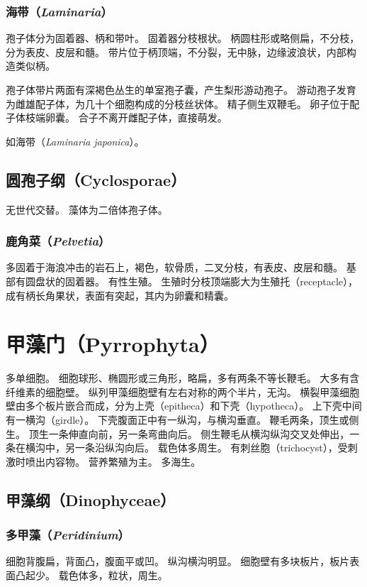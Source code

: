 \documentclass[11pt]{article}
\begin{document}
\subsubsection{海带（\textit{Laminaria}）}
孢子体分为固着器、柄和带叶。
固着器分枝根状。
柄圆柱形或略侧扁，不分枝，分为表皮、皮层和髓。
带片位于柄顶端，不分裂，无中脉，边缘波浪状，内部构造类似柄。

\newline

孢子体带片两面有深褐色丛生的单室孢子囊，产生梨形游动孢子。
游动孢子发育为雌雄配子体，为几十个细胞构成的分枝丝状体。
精子侧生双鞭毛。
卵子位于配子体枝端卵囊。
合子不离开雌配子体，直接萌发。

\newline

如海带（\textit{Laminaria japonica}）。

\subsection{圆孢子纲（Cyclosporae）}
无世代交替。
藻体为二倍体孢子体。

\subsubsection{鹿角菜（\textit{Pelvetia}）}
多固着于海浪冲击的岩石上，褐色，软骨质，二叉分枝，有表皮、皮层和髓。
基部有圆盘状的固着器。
有性生殖。
生殖时分枝顶端膨大为生殖托（receptacle），成有柄长角果状，表面有突起，其内为卵囊和精囊。

\section{甲藻门（Pyrrophyta）}
多单细胞。
细胞球形、椭圆形或三角形，略扁，多有两条不等长鞭毛。
大多有含纤维素的细胞壁。
纵列甲藻细胞壁有左右对称的两个半片，无沟。
横裂甲藻细胞壁由多个板片嵌合而成，分为上壳（epitheca）和下壳（hypotheca）。
上下壳中间有一横沟（girdle）。
下壳腹面正中有一纵沟，与横沟垂直。
鞭毛两条，顶生或侧生。
顶生一条伸直向前，另一条弯曲向后。
侧生鞭毛从横沟纵沟交叉处伸出，一条在横沟中，另一条沿纵沟向后。
载色体多周生。
有刺丝胞（trichocyst），受刺激时喷出内容物。
营养繁殖为主。
多海生。

\subsection{甲藻纲（Dinophyceae）}

\subsubsection{多甲藻（\textit{Peridinium}）}
细胞背腹扁，背面凸，腹面平或凹。
纵沟横沟明显。
细胞壁有多块板片，板片表面凸起少。
载色体多，粒状，周生。
\end{document}

